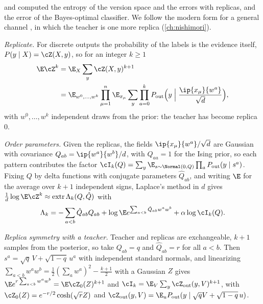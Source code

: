 \begin{refsection}
\Textcite{Gyorgyi1990} and \textcite{SompolinskyTishbySeung1990} computed the entropy of the version space and the errors with replicas, and \textcite{OpperHaussler1991} the error of the Bayes-optimal classifier. We follow the modern form for a general channel \parencite{ZdeborovaKrzakala2016,BarbierEtAl2019}, in which the teacher is one more replica (\cref{ch:nishimori}).

\begin{heuristic}
\emph{Replicate.} For discrete outputs the probability of the labels is the evidence itself, $P(y\mid X)=\cZ(X,y)$, so for an integer $k\ge1$
\begin{align*}
\E\cZ^k&=\E_X\sum_y\cZ(X,y)^{k+1}\\
&=\E_{w^0,\dots,w^k}\prod_{\mu=1}^n\E_{x_\mu}\sum_y\prod_{a=0}^k\glmPout\Bigl(y\Bigm|\frac{\ip{x_\mu}{w^a}}{\sqrt d}\Bigr),
\end{align*}
with $w^0,\dots,w^k$ independent draws from the prior: the teacher has become replica $0$.

\emph{Order parameters.} Given the replicas, the fields $\ip{x_\mu}{w^a}/\sqrt d$ are Gaussian with covariance $Q_{ab}=\ip{w^a}{w^b}/d$, with $Q_{aa}=1$ for the Ising prior, so each pattern contributes the factor $\cI_k(Q)=\sum_y\E_{s\sim\Normal(0,Q)}\prod_a\glmPout(y\mid s^a)$. Fixing $Q$ by delta functions with conjugate parameters $\hat Q_{ab}$, and writing $\E$ for the average over $k+1$ independent signs, Laplace's method in $d$ gives $\frac1d\log\E\cZ^k\approx\operatorname{extr}\Lambda_k(Q,\hat Q)$ with
\[
\Lambda_k=-\sum_{a<b}\hat Q_{ab}Q_{ab}+\log\E e^{\sum_{a<b}\hat Q_{ab}w^aw^b}+\alpha\log\cI_k(Q).
\]

\emph{Replica symmetry with a teacher.} Teacher and replicas are exchangeable, $k+1$ samples from the posterior, so take $Q_{ab}=q$ and $\hat Q_{ab}=r$ for all $a<b$. Then $s^a=\sqrt q\,V+\sqrt{1-q}\,u^a$ with independent standard normals, and linearizing $\sum_{a<b}w^aw^b=\frac12(\sum_aw^a)^2-\frac{k+1}2$ with a Gaussian $Z$ gives $\E e^{r\sum_{a<b}w^aw^b}=\E\cZ_0(Z)^{k+1}$ and $\cI_k=\E_V\sum_y\glmZout(y,V)^{k+1}$, with $\cZ_0(Z)=e^{-r/2}\cosh(\sqrt rZ)$ and $\glmZout(y,V)=\E_u\glmPout(y\mid\sqrt qV+\sqrt{1-q}\,u)$.


\end{heuristic}
\end{refsection}
